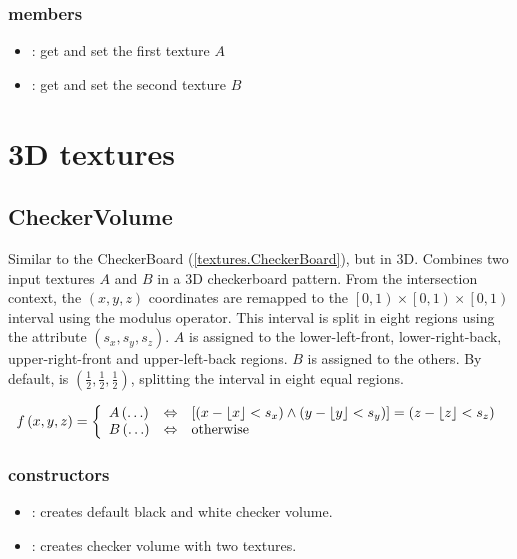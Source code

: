 \subsubsection*{members}
\begin{itemize}
	\item {}:
		get and set the first texture $A$
	\item {}:
		get and set the second texture $B$
\end{itemize}

\section{3D textures} %



\subsection{CheckerVolume}

Similar to the CheckerBoard (\ref{textures.CheckerBoard}), but in 3D.  Combines two input textures $A$ and $B$ in a 3D checkerboard pattern.  From the intersection context, the $\left(x, y, z\right)$ coordinates are remapped to the $\left[0, 1\right) \times \left[0, 1\right) \times \left[0, 1\right)$ interval using the modulus operator.  This interval is split in eight regions using the  attribute $\left(s_x, s_y, s_z\right)$.  $A$ is assigned to the lower-left-front, lower-right-back, upper-right-front and upper-left-back regions. $B$ is assigned to the others.  By default,  is $\left(\frac 1 2, \frac 1 2, \frac 1 2\right)$, splitting the interval in eight equal regions.

\begin{equation}
	f\left(x, y, z\right) = \left\{
		\begin{array}{lcl}
			A\left(\ldots\right) & \Leftrightarrow & 
				\left[
					\left(x - \left\lfloor x \right\rfloor < s_x\right) \wedge
					\left(y - \left\lfloor y \right\rfloor < s_y\right)
				\right] =
				\left(z - \left\lfloor z \right\rfloor < s_z\right) \\
			B\left(\ldots\right) & \Leftrightarrow & \textnormal{otherwise}
		\end{array}
	\right.
\end{equation}

\subsubsection*{constructors}
\begin{itemize}
	\item {}:
		creates default black and white checker volume.
	\item {}:
		creates checker volume with two textures.
\end{itemize}

